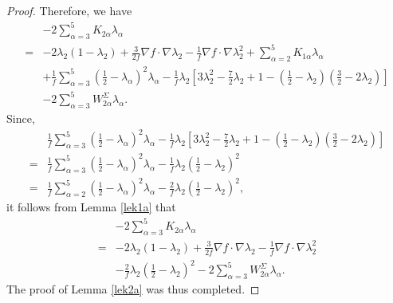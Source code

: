 \documentclass[12pt]{amsart}
\begin{document}
\begin{proof}
Therefore, we have
\begin{equation*}
	\begin{aligned}
		&-2\sum_{\alpha=3}^5K_{2\alpha}\lambda_\alpha\\
		=&-2\lambda_{2}(1-\lambda_{2})+\frac{3}{2f}\nabla f\cdot \nabla \lambda_2-\frac{1}{f}\nabla f\cdot \nabla \lambda_2^2+\sum_{\alpha=2}^5K_{1\alpha}\lambda_\alpha\\
		&+\frac{1}{f}\sum_{\alpha=3}^5({\frac{1}{2}}-\lambda_{\alpha})^2\lambda_{\alpha}
		-\frac{1}{f}\lambda_2\left[ 3\lambda^2_2-\frac{7}{2}\lambda_2+1 -(\frac{1}{2}-\lambda_2)({\frac{3}{2}}-2\lambda_{2})\right] \\
		&-2\sum_{\alpha=3}^5 W^{\Sigma}_{2\alpha}\lambda_{\alpha}.
	\end{aligned}
\end{equation*}
Since,
\begin{equation*}
	\begin{aligned}
		&\frac{1}{f}\sum_{\alpha=3}^5({\frac{1}{2}}-\lambda_{\alpha})^2\lambda_{\alpha}
		-\frac{1}{f}\lambda_2\left[ 3\lambda^2_2-\frac{7}{2}\lambda_2+1 -(\frac{1}{2}-\lambda_2)({\frac{3}{2}}-2\lambda_{2})\right] \\
		=&\frac{1}{f}\sum_{\alpha=3}^5({\frac{1}{2}}-\lambda_{\alpha})^2\lambda_{\alpha}
		-\frac{1}{f}\lambda_2({\frac{1}{2}}-\lambda_{2})^2 \\
		=&\frac{1}{f}\sum_{\alpha=2}^5({\frac{1}{2}}-\lambda_{\alpha})^2\lambda_{\alpha}
		-\frac{2}{f}\lambda_2({\frac{1}{2}}-\lambda_{2})^2,
	\end{aligned}
\end{equation*}
it follows from Lemma \ref{lek1a} that
\begin{equation*}
	\begin{aligned}
		&-2\sum_{\alpha=3}^5K_{2\alpha}\lambda_\alpha\\
		=&-2\lambda_{2}(1-\lambda_{2})+\frac{3}{2f}\nabla f\cdot \nabla \lambda_2-\frac{1}{f}\nabla f\cdot \nabla \lambda_2^2\\
		&-\frac{2}{f}\lambda_2({\frac{1}{2}}-\lambda_{2})^2-2\sum_{\alpha=3}^5 W^{\Sigma}_{2\alpha}\lambda_{\alpha}.
	\end{aligned}
\end{equation*}
The proof of Lemma \ref{lek2a} was thus completed.
\end{proof}
	
\end{document}

